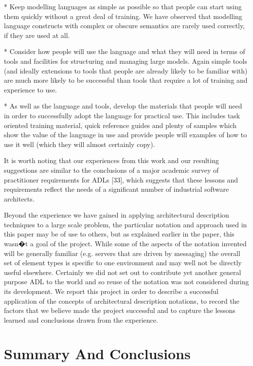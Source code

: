 \begin{itemise}
* Keep modelling languages as simple as possible so that people can start using them quickly without a great deal of training.  We have observed that modelling language constructs with complex or obscure semantics are rarely used correctly, if they are used at all.

* Consider how people will use the language and what they will need in terms of tools and facilities for structuring and managing large models.  Again simple tools (and ideally extensions to tools that people are already likely to be familiar with) are much more likely to be successful than tools that require a lot of training and experience to use.

* As well as the language and tools, develop the materials that people will need in order to successfully adopt the language for practical use.  This includes task oriented training material, quick reference guides and plenty of samples which show the value of the language in use and provide people will examples of how to use it well (which they will almost certainly copy).

  It is worth noting that our experiences from this work and our resulting suggestions are similar to the conclusions of a major academic survey of practitioner requirements for ADLs [33], which suggests that these lessons and requirements reflect the needs of a significant number of industrial software architects.

  Beyond the experience we have gained in applying architectural description techniques to a large scale problem, the particular notation and approach used in this paper may be of use to others, but as explained earlier in the paper, this wasn�t a goal of the project. While some of the aspects of the notation invented will be generally familiar (e.g. servers that are driven by messaging) the overall set of element types is specific to one environment and may well not be directly useful elsewhere.  Certainly we did not set out to contribute yet another general purpose ADL to the world and so reuse of the notation was not considered during its development.  We report this project in order to describe a successful application of the concepts of architectural description notations, to record the factors that we believe made the project successful and to capture the lessons learned and conclusions drawn from the experience.

\section{Summary And Conclusions}


\end{itemise}
